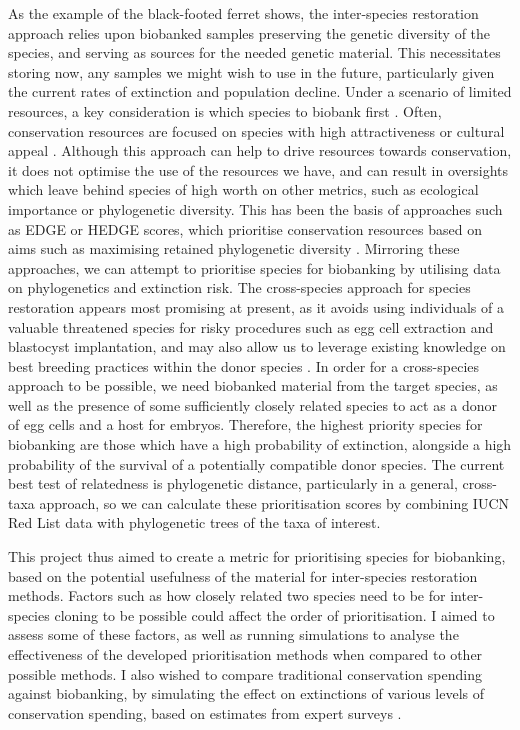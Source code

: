 \documentclass[12pt]{article}
\begin{document}
	As the example of the black-footed ferret shows, the inter-species restoration approach
	relies upon biobanked samples preserving the genetic diversity of the species, and
	serving as sources for the needed genetic material. This necessitates storing now,
	any samples we might wish to use in the future, particularly given the current
	rates of extinction and population decline. Under a scenario of limited resources,
	a key consideration is
	which species to biobank first \citep{harwoodDevelopingImplementingPrioritisation2021}.
	Often, conservation resources are focused on species with high attractiveness or
	cultural appeal \citep{gunnthorsdottirPhysicalAttractivenessAnimal2001}. Although this approach can help to drive resources
	towards conservation, it does not optimise the use of the resources we have, 
	and can result in oversights which leave behind species of high worth on other
	metrics, such as ecological importance or phylogenetic diversity. This has been
	the basis of approaches such as EDGE or HEDGE scores, which prioritise conservation 
	resources based on aims such as maximising retained phylogenetic diversity \citep{isaacMammalsEDGEConservation2007,steelHedgingOurBets2007}.
	Mirroring these approaches, we can attempt to prioritise species for biobanking
	by utilising data on phylogenetics and extinction risk.
	The cross-species approach for species restoration appears most promising at present, as it avoids using
	individuals of a valuable threatened species for risky procedures such as egg cell
	extraction and blastocyst implantation, and may also allow us to leverage existing
	knowledge on best breeding practices within the donor species \citep{wiselyRoadMap21st2015}. In order for a
	cross-species approach to be possible, we need biobanked material from the target
	species, as well as the presence of some sufficiently closely related species to act
	as a donor of egg cells and a host for embryos. Therefore, the highest priority species
	for biobanking are those which have a high probability of extinction, alongside a high
	probability of the survival of a potentially compatible donor species. The current best test of
	relatedness is phylogenetic distance, particularly in a general, cross-taxa approach, so we can calculate these prioritisation
	scores by combining IUCN Red List data with phylogenetic trees of the taxa of 
	interest.
	
	This project thus aimed to create a metric for prioritising species for
	biobanking, based on the potential usefulness of the material for inter-species
	restoration methods. Factors such as how closely related two species need to
	be for inter-species cloning to be possible could affect the order of
	prioritisation. I aimed to assess some of these factors, as well as running
	simulations to analyse the effectiveness of the developed prioritisation
	methods when compared to other possible methods. I also wished to compare
	traditional conservation spending against biobanking, by simulating the
	effect on extinctions of various levels of conservation spending, based on
	estimates from expert surveys
	\citep{mccarthyFinancialCostsMeeting2012,nunesPriceConservingAvian2015}.
\end{document}
